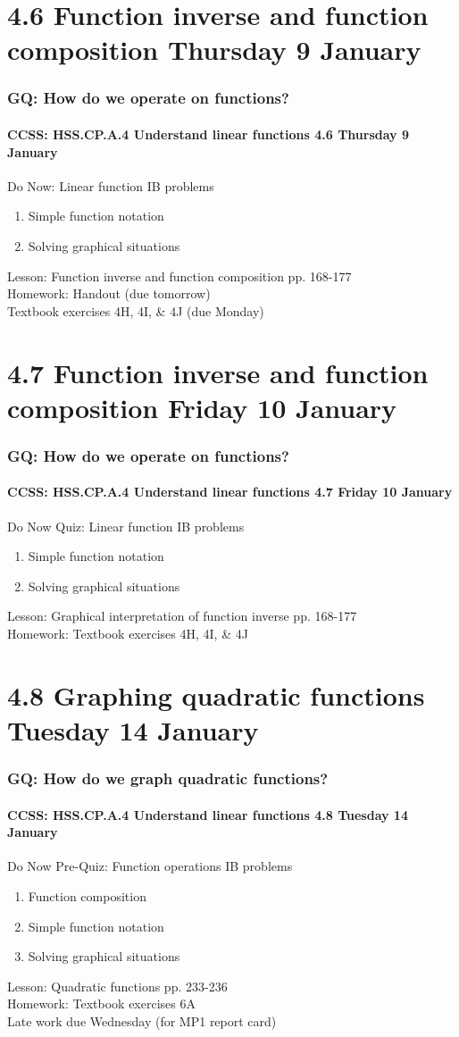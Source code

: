 \documentclass{beamer}
\begin{document}
\section{4.6 Function inverse and function composition Thursday 9 January}
\frame
{
  \frametitle{GQ: How do we operate on functions?}
  \framesubtitle{CCSS: HSS.CP.A.4 Understand linear functions \hfill \alert{4.6 Thursday 9 January}}

  \begin{block}{Do Now: Linear function IB problems}
  \begin{enumerate}
      \item Simple function notation
      \item Solving graphical situations
  \end{enumerate}
  \end{block}
  Lesson: Function inverse and function composition pp. 168-177 \\ \smallskip
  Homework: Handout (due tomorrow)\\
  Textbook exercises 4H, 4I, \& 4J (due Monday)
}

\section{4.7 Function inverse and function composition Friday 10 January}
\frame
{
  \frametitle{GQ: How do we operate on functions?}
  \framesubtitle{CCSS: HSS.CP.A.4 Understand linear functions \hfill \alert{4.7 Friday 10 January}}

  \begin{block}{Do Now Quiz: Linear function IB problems}
  \begin{enumerate}
      \item Simple function notation
      \item Solving graphical situations
  \end{enumerate}
  \end{block}
  Lesson: Graphical interpretation of function inverse pp. 168-177 \\ \smallskip
  Homework: Textbook exercises 4H, 4I, \& 4J
}

\section{4.8 Graphing quadratic functions Tuesday 14 January}
\frame
{
  \frametitle{GQ: How do we graph quadratic functions?}
  \framesubtitle{CCSS: HSS.CP.A.4 Understand linear functions \hfill \alert{4.8 Tuesday 14 January}}

  \begin{block}{Do Now Pre-Quiz: Function operations IB problems}
  \begin{enumerate}
      \item Function composition
      \item Simple function notation
      \item Solving graphical situations
  \end{enumerate}
  \end{block}
  Lesson: Quadratic functions pp. 233-236 \\ \smallskip
  Homework: Textbook exercises 6A \\
  \alert{Late work due Wednesday (for MP1 report card)}
}
\end{document}
